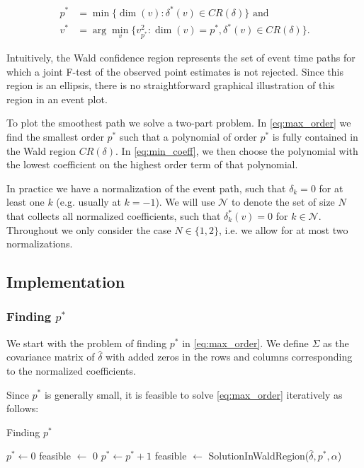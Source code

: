 \documentclass[bib]{./sty/statapress}
\begin{document}
\begin{align}
  p^* &= \min\{\dim(v): \delta^*(v) \in CR(\delta)\} \text{ and}  \label{eq:max_order} \\
  v^* &= \arg\min_{v}\{v_{p^*}^2: \dim(v)=p^*, \delta^*(v) \in CR(\delta)\}. \label{eq:min_coeff}
\end{align}

Intuitively, the Wald confidence region represents the set of event time paths for which a joint F-test of the observed point estimates is not rejected. Since this region is an ellipsis, there is no straightforward graphical illustration of this region in an event plot.

To plot the smoothest path we solve a two-part problem.  In \eqref{eq:max_order} we find the smallest order $p^*$ such that a polynomial of order $p^*$ is fully contained in the Wald region $CR(\delta)$. In \eqref{eq:min_coeff}, we then choose the polynomial with the lowest coefficient on the highest order term of that polynomial.

In practice we have a normalization of the event path, such that $\delta_{k} = 0$ for at least one $k$ (e.g. usually at $k=-1$). We will use $\mathcal{N}$ to denote the set of size $N$ that collects all normalized coefficients, such that $\delta_{k}^*(v)=0$ for $k \in \mathcal{N}$. Throughout we only consider the case $N\in\{1,2\}$, i.e. we allow for at most two normalizations.

\subsection{Implementation}

\subsubsection{Finding $p^*$}

We start with the problem of finding $p^*$ in \eqref{eq:max_order}. We define $\Sigma$ as the covariance matrix of $\hat \delta$ with added zeros in the rows and columns corresponding to the normalized coefficients.

Since $p^*$ is generally small, it is feasible to solve \eqref{eq:max_order} iteratively as follows:
\begin{algorithm}
\caption{Finding $p^*$}
\label{alg:find_p}
\begin{algorithmic}
\State $p^* \gets 0$
\State feasible $\gets$ 0
    \State $p^* \gets p^*+1$
  \State feasible $\gets$ SolutionInWaldRegion($\hat\delta,p^*,\alpha$)
\EndWhile
\end{algorithmic}
\end{algorithm}
\end{document}
